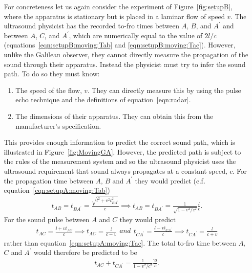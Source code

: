 \documentclass[10pt, fleqn,final,showtrims,oldfontcommands, article,a4paper,oneside]{memoir} %
\newcommand{\sub}[1]{\begin{subequations}#1\end{subequations}}
\newcommand{\eqnref}[1]{\ref{eqn:#1}}
\newcommand{\figref}[1]{Figure~\ref{fig:#1}}
\newcommand{\nlist}[1]
	   {  
	     \begin{enumerate}
	       #1
	     \end{enumerate} 
	   }
\begin{document}
For concreteness let us again consider the experiment of \figref{setupB},
where the apparatus is stationary but is placed in a laminar flow of speed $v$.
The ultrasound physicist has the recorded to-fro times between $A$, $B$, and $A^\prime$ and between
$A$, $C$, and $A^\prime$, which are numerically equal to the value of $2l/c$ (equations~\ref{eqn:setupB:moving:Tab} and \ref{eqn:setupB:moving:Tac}).
However, unlike the Galilean observer, they cannot directly measure the propagation of the sound through their apparatus.
Instead the physicist must try to infer the sound path.
To do so they  must know:
\nlist{
\item The speed of the flow, $v$.
They can directly measure this by using the pulse echo technique and the definitions of equation~\eqnref{radar}.
\item The dimensions of their apparatus.
They can obtain this from the manufacturer's specification.
}
This provides enough information to predict the correct sound path, which is illustrated in \figref{MovingGA}.
However, the predicted path  is subject to the rules of the measurement system 
and so the ultrasound physicist uses the ultrasound requirement that  sound always propagates at a  constant speed, $c$.
For the propagation time between $A$, $B$ and $A^\prime$ they would predict (c.f. equation~\ref{eqn:setupA:moving:Tab})
\begin{align}
  \label{eqn:setupA:moving:Tab:acoustic}
  t_{AB} = t_{BA^\prime} =  \frac{\sqrt{l^2+v^2t_{BA^\prime}^2}}{c} \implies t_{AB} =  t_{BA^\prime} =\frac{1}{\sqrt{1-v^2/c^2}} \frac{l}{c}.
\end{align}
For the sound pulse between $A$ and $C$  they would predict
\sub{
\begin{align}
 t_{AC} =  \frac{l+vt_{AC}}{c}\implies t_{AC} = \frac{l}{c-v}
\end{align}
and 
\begin{align}
 t_{CA^\prime} =  \frac{l-vt_{CA^\prime}}{c} \implies t_{CA^\prime} = \frac{l}{c+v}
\end{align}
}
rather than  equation~\ref{eqn:setupA:moving:Tac}.
The total to-fro time between $A$, $C$ and $A^\prime$ would therefore be predicted to be
\begin{align}
\label{eqn:setupA:moving:Tac:acoustic}
t_{AC}+t_{CA^\prime} = \frac{1}{{1-v^2/c^2}} \frac{2l}{c}.
\end{align}
\end{document}

